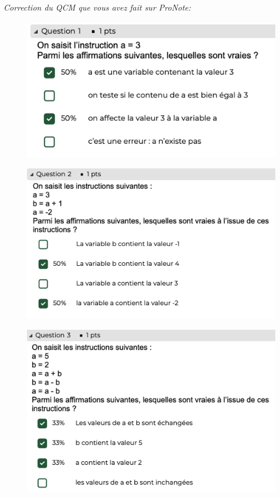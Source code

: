 \documentclass[12pt]{article}
\begin{document}
	\textit{Correction du QCM que vous avez fait sur ProNote:}
	\nopagebreak
	\begin{figure}[H]
		\centering
		\includegraphics[scale = 0.5]{003_QCM_Q1.png}
	\end{figure}
	\begin{figure}[H]
		\centering
		\includegraphics[scale = 0.5]{004_QCM_Q2.png}
	\end{figure}
	\begin{figure}[H]
		\centering
		\includegraphics[scale = 0.5]{005_QCM_Q3.png}
	\end{figure}
\end{document}
